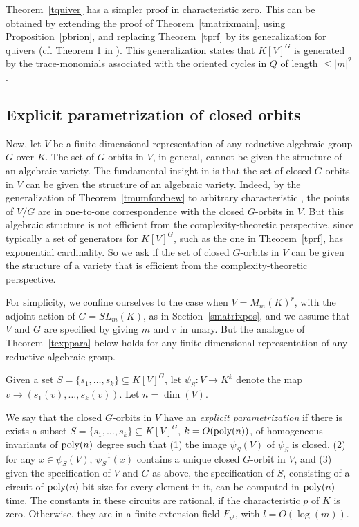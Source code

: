 \documentclass[11pt]{article}
\begin{document}
Theorem~\ref{tquiver} has a simpler  proof in  characteristic zero.
This can be obtained
by extending the proof of Theorem~\ref{tmatrixmain},
using Proposition~\ref{pbrion},  and replacing Theorem~\ref{tprf} by its 
generalization for quivers
(cf. Theorem 1 in  \cite{procesiquiver}). This generalization states  that 
$K[V]^G$ is generated by the  trace-monomials associated with the oriented cycles in $Q$ of length $\le |m|^2$. 



\subsection{Explicit  parametrization of closed orbits} \label{sclosed}
Now, let $V$ be a finite dimensional representation of any reductive \cite{milne} 
algebraic group $G$ over $K$.
The set of  $G$-orbits in $V$, in general,  cannot be given the structure of an
algebraic variety. The fundamental insight in \cite{mumford} is that the set of closed $G$-orbits
in $V$ can be given the structure of an algebraic variety. Indeed, by the generalization of Theorem~\ref{tmumfordnew} to
arbitrary characteristic \cite{mumford},
the points of $V/G$ are in
one-to-one correspondence with the closed $G$-orbits in $V$. But this algebraic structure is not
efficient from the complexity-theoretic perspective, since typically a  set of generators 
for $K[V]^G$, such as the one in Theorem~\ref{tprf},  has exponential cardinality.
So we ask if the set of closed
$G$-orbits in $V$ can be given the structure of a variety
that is efficient from the complexity-theoretic perspective.

For simplicity, we  confine
ourselves to the case when $V=M_m(K)^r$, with the adjoint action of 
$G=SL_m(K)$,
as in Section~\ref{smatrixpos}, and  we assume that $V$ and $G$ are 
specified by giving $m$ and $r$ in unary.
But the analogue of Theorem~\ref{texppara}  below  holds 
for any finite dimensional
representation  of any reductive algebraic group.

Given a set $S =\{s_1,\ldots,s_k\} \subseteq K[V]^G$, let $\psi_S: V \rightarrow K^k$ denote the 
map $v \rightarrow  (s_1(v), \ldots,s_k(v))$. Let $n=\dim(V)$.

\begin{defn} \label{dexppara}
We say that  the closed $G$-orbits in $V$ have an 
{\em explicit parametrization} if
there is exists a subset $S =\{s_1,\ldots,s_k\} \subseteq K[V]^G$, $k=O({\mbox {poly}}(n))$,
of homogeneous invariants of ${\mbox {poly}}(n)$ degree such that 
(1) the image $\psi_S(V)$ of $\psi_S$  is closed,
(2)  for any $x \in \psi_S(V)$, $\psi_S^{-1}(x)$ contains a unique closed $G$-orbit in $V$, and
(3) given the specification of $V$ and $G$ as above, the specification of $S$, consisting of a circuit of ${\mbox {poly}}(n)$  bit-size for every 
element in it, can be computed in ${\mbox {poly}}(n)$ time. 
The constants in these circuits are rational, if the
characteristic $p$ of $K$ is zero. Otherwise, they are in a finite  extension field $F_{p^l}$, with $l=O(\log(m))$.
\end{defn}
\end{document}
